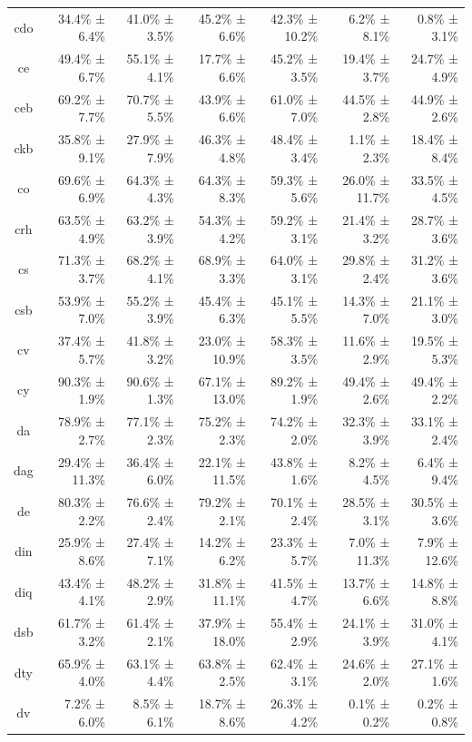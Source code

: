 \documentclass[10pt, a4paper]{article}
\begin{document}
\begin{table}[h]
\begin{tabular}{crrrrrr}
cdo & 34.4\% ± 6.4\% & 41.0\% ± 3.5\% & 45.2\% ± 6.6\% & 42.3\% ± 10.2\% & 6.2\% ± 8.1\% & 0.8\% ± 3.1\% \\
ce & 49.4\% ± 6.7\% & 55.1\% ± 4.1\% & 17.7\% ± 6.6\% & 45.2\% ± 3.5\% & 19.4\% ± 3.7\% & 24.7\% ± 4.9\% \\
ceb & 69.2\% ± 7.7\% & 70.7\% ± 5.5\% & 43.9\% ± 6.6\% & 61.0\% ± 7.0\% & 44.5\% ± 2.8\% & 44.9\% ± 2.6\% \\
ckb & 35.8\% ± 9.1\% & 27.9\% ± 7.9\% & 46.3\% ± 4.8\% & 48.4\% ± 3.4\% & 1.1\% ± 2.3\% & 18.4\% ± 8.4\% \\
co & 69.6\% ± 6.9\% & 64.3\% ± 4.3\% & 64.3\% ± 8.3\% & 59.3\% ± 5.6\% & 26.0\% ± 11.7\% & 33.5\% ± 4.5\% \\
crh & 63.5\% ± 4.9\% & 63.2\% ± 3.9\% & 54.3\% ± 4.2\% & 59.2\% ± 3.1\% & 21.4\% ± 3.2\% & 28.7\% ± 3.6\% \\
cs & 71.3\% ± 3.7\% & 68.2\% ± 4.1\% & 68.9\% ± 3.3\% & 64.0\% ± 3.1\% & 29.8\% ± 2.4\% & 31.2\% ± 3.6\% \\
csb & 53.9\% ± 7.0\% & 55.2\% ± 3.9\% & 45.4\% ± 6.3\% & 45.1\% ± 5.5\% & 14.3\% ± 7.0\% & 21.1\% ± 3.0\% \\
cv & 37.4\% ± 5.7\% & 41.8\% ± 3.2\% & 23.0\% ± 10.9\% & 58.3\% ± 3.5\% & 11.6\% ± 2.9\% & 19.5\% ± 5.3\% \\
cy & 90.3\% ± 1.9\% & 90.6\% ± 1.3\% & 67.1\% ± 13.0\% & 89.2\% ± 1.9\% & 49.4\% ± 2.6\% & 49.4\% ± 2.2\% \\
da & 78.9\% ± 2.7\% & 77.1\% ± 2.3\% & 75.2\% ± 2.3\% & 74.2\% ± 2.0\% & 32.3\% ± 3.9\% & 33.1\% ± 2.4\% \\
dag & 29.4\% ± 11.3\% & 36.4\% ± 6.0\% & 22.1\% ± 11.5\% & 43.8\% ± 1.6\% & 8.2\% ± 4.5\% & 6.4\% ± 9.4\% \\
de & 80.3\% ± 2.2\% & 76.6\% ± 2.4\% & 79.2\% ± 2.1\% & 70.1\% ± 2.4\% & 28.5\% ± 3.1\% & 30.5\% ± 3.6\% \\
din & 25.9\% ± 8.6\% & 27.4\% ± 7.1\% & 14.2\% ± 6.2\% & 23.3\% ± 5.7\% & 7.0\% ± 11.3\% & 7.9\% ± 12.6\% \\
diq & 43.4\% ± 4.1\% & 48.2\% ± 2.9\% & 31.8\% ± 11.1\% & 41.5\% ± 4.7\% & 13.7\% ± 6.6\% & 14.8\% ± 8.8\% \\
dsb & 61.7\% ± 3.2\% & 61.4\% ± 2.1\% & 37.9\% ± 18.0\% & 55.4\% ± 2.9\% & 24.1\% ± 3.9\% & 31.0\% ± 4.1\% \\
dty & 65.9\% ± 4.0\% & 63.1\% ± 4.4\% & 63.8\% ± 2.5\% & 62.4\% ± 3.1\% & 24.6\% ± 2.0\% & 27.1\% ± 1.6\% \\
dv & 7.2\% ± 6.0\% & 8.5\% ± 6.1\% & 18.7\% ± 8.6\% & 26.3\% ± 4.2\% & 0.1\% ± 0.2\% & 0.2\% ± 0.8\% \\

\end{tabular}
\end{table}
\end{document}
